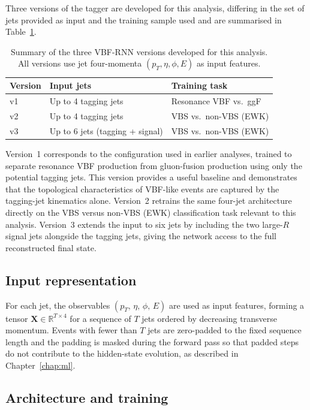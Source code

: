 Three versions of the tagger are developed for this analysis, differing in the set of jets provided as input and the training sample used and are summarised in Table~\ref{tab:vbfrnn_versions}.

\begin{table}[h]
\centering
\caption{Summary of the three VBF-RNN versions developed for this analysis. All versions use jet four-momenta $(p_T, \eta, \phi, E)$ as input features.}
\label{tab:vbfrnn_versions}
\begin{tabular}{lll}
\toprule
Version & Input jets & Training task \\
\midrule
v1 & Up to 4 tagging jets             & Resonance VBF vs.\ ggF \\
v2 & Up to 4 tagging jets             & VBS vs.\ non-VBS (EWK) \\
v3 & Up to 6 jets (tagging + signal)  & VBS vs.\ non-VBS (EWK) \\
\bottomrule
\end{tabular}
\end{table}

Version~1 corresponds to the configuration used in earlier analyses, trained to separate resonance VBF production from gluon-fusion production using only the potential tagging jets. This version provides a useful baseline and demonstrates that the topological characteristics of VBF-like events are captured by the tagging-jet kinematics alone. Version~2 retrains the same four-jet architecture directly on the VBS versus non-VBS (EWK) classification task relevant to this analysis. Version~3 extends the input to six jets by including the two large-$R$ signal jets alongside the tagging jets, giving the network access to the full reconstructed final state.

\subsection{Input representation}

For each jet, the observables $(p_T,\,\eta,\,\phi,\,E)$ are used as input features, forming a tensor $\mathbf{X} \in \mathbb{R}^{T \times 4}$ for a sequence of $T$ jets ordered by decreasing transverse momentum. Events with fewer than $T$ jets are zero-padded to the fixed sequence length and the padding is masked during the forward pass so that padded steps do not contribute to the hidden-state evolution, as described in Chapter~\ref{chap:ml}.

\subsection{Architecture and training}

